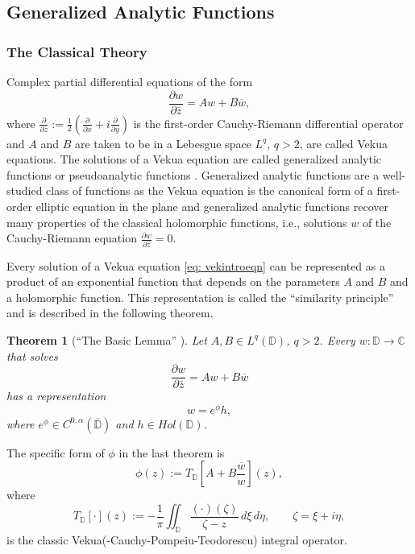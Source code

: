 \documentclass[12pt,reqno]{amsart}
\newtheorem{theorem}{Theorem}[section]
\theoremstyle{definition}
\theoremstyle{remark}
\newcommand{\p}{\partial}
\newcommand{\z}{\bar z}
\newcommand{\disk}{\mathbb{D}}
\begin{document}
    \subsection{Generalized Analytic Functions}

        \subsubsection{The Classical Theory}

            Complex partial differential equations of the form 
            \begin{equation}\label{eq: vekintroeqn}
                \frac{\p w}{\p\z} = Aw + B\overline{w},
            \end{equation}
            where $\frac{\p}{\p\z} := \frac{1}{2} \left( \frac{\p}{\p x} + i \frac{\p}{\p y} \right)$ is the first-order Cauchy-Riemann differential operator and $A$ and $B$ are taken to be in a Lebesgue space $L^q$, $q>2$, are called Vekua equations. The solutions of a Vekua equation are called generalized analytic functions \cite{Vek} or pseudoanalytic functions \cite{Bers}. Generalized analytic functions are a well-studied class of functions as the Vekua equation is the canonical form of a first-order elliptic equation in the plane and generalized analytic functions recover many properties of the classical holomorphic functions, i.e., solutions $w$ of the Cauchy-Riemann equation $\frac{\p w}{\p\z} = 0$.

            Every solution of a Vekua equation \eqref{eq: vekintroeqn} can be represented as a product of an exponential function that depends on the parameters $A$ and $B$ and a holomorphic function. This representation is called the ``similarity principle'' and is described in the following theorem. 

            \begin{theorem}[``The Basic Lemma'' \cite{Vek}]\label{simprin}
            Let $A, B \in L^q(\disk)$, $q>2$. Every $w: \disk\to\mathbb{C}$ that solves
            \[
                \frac{\p w}{\p\z} = Aw + B\overline{w}
            \]
            has a representation
            \begin{equation}\label{eq: simprinrep}
            w = e^\phi h,
            \end{equation}
            where $e^\phi \in C^{0,\alpha}(\overline{\disk})$ and $h \in Hol(\disk)$.
            \end{theorem}

            The specific form of $\phi$ in the last theorem is 
            \[
                \phi(z) := T_{\disk}\left[A + B\frac{\overline{w}}{w}\right](z),
            \]
            where
            \[
                T_{\disk}[\cdot](z):=-\frac{1}{\pi} \iint_\disk \frac{(\cdot)(\zeta)}{\zeta - z} \,d\xi\,d\eta, \quad\quad \zeta = \xi + i\eta,
            \]
            is the classic Vekua(-Cauchy-Pompeiu-Teodorescu) integral operator.
\end{document}
